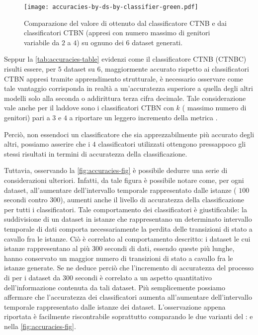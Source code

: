 \begin{figure}
	\centering
	\texttt{[image: accuracies-by-ds-by-classifier-green.pdf]}
	\caption[Accuratezza dei classificatori \acs{CTBN} e \acs{CTNB}]{Comparazione del valore di \emph{} ottenuto dal classificatore \acs{CTNB} e dai classificatori \acs{CTBN} (appresi con numero massimo di genitori variabile da $2$ a $4$) su ognuno dei $6$ dataset generati.}\label{fig:accuracies-fig}
\end{figure}
Seppur la \vref{tab:accuracies-table} evidenzi come il classificatore \acs{CTNB} (\acs{CTNBC}) risulti essere, per $5$ dataset su $6$, maggiormente accurato rispetto ai classificatori \acs{CTBN} appresi tramite apprendimento strutturale, è necessario osservare come tale vantaggio corrisponda in realtà a un'accuratezza superiore a quella degli altri modelli solo alla seconda o addirittura terza cifra decimale. Tale considerazione vale anche per il  laddove sono i classificatori \acs{CTBN} con $k$ (\ie{} massimo numero di genitori) pari a $3$ e $4$ a riportare un leggero incremento della metrica \emph{}.

Perciò, non essendoci un classificatore che sia apprezzabilmente più accurato degli altri, possiamo asserire che i $4$ classificatori utilizzati ottengono pressappoco gli stessi risultati in termini di accuratezza della classificazione.

Tuttavia, osservando la \vref{fig:accuracies-fig} è possibile dedurre una serie di considerazioni ulteriori. Infatti, da tale figura è possibile notare come, per ogni dataset, all'aumentare dell'intervallo temporale rappresentato dalle istanze (\ie{} $100$ secondi contro $300$), aumenti anche il livello di accuratezza della classificazione per tutti i classificatori. Tale comportamento dei classificatori è giustificabile: la suddivisione di un dataset in istanze che rappresentano un determinato intervallo temporale di dati comporta necessariamente la perdita delle transizioni di stato a cavallo fra le istanze. Ciò è correlato al comportamento descritto: i dataset le cui istanze rappresentano al più $300$ secondi di dati, essendo queste più lunghe, hanno conservato un maggior numero di transizioni di stato a cavallo fra le istanze generate. Se ne deduce perciò che l'incremento di accuratezza del processo di  per i dataset da $300$ secondi è correlato a un aspetto quantitativo dell'informazione contenuta da tali dataset. Più semplicemente possiamo affermare che l'accuratezza dei classificatori aumenta all'aumentare dell'intervallo temporale rappresentato dalle istanze dei dataset. L'osservazione appena riportata è facilmente riscontrabile soprattutto comparando le due varianti del :  e  nella \vref{fig:accuracies-fig}.

